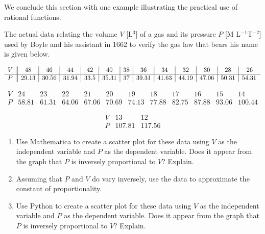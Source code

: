 \ifanalysis
We conclude this section with one example illustrating the practical use of rational functions. 



\begin{example}
\label{ex_druk}
The actual data relating the volume $V$ [L$^3$] of a gas and its pressure $P$ [M L$^{-1}$T$^{-2}$] used by Boyle and his assistant in 1662 to verify the gas law that bears his name is given below.

\[ \begin{array}{c||c|c|c|c|c|c|c|c|c|c|c|c}  

V & 48 & 46 & 44 & 42 & 40 & 38 & 36 & 34 & 32 & 30 & 28 & 26   \\ \hline

P & 29.13 & 30.56 & 31.94 & 33.5 & 35.31 & 37 & 39.31 & 41.63 & 44.19 & 47.06 & 50.31 & 54.31 $\,$   \end{array} \]


\[\begin{array}{c||c|c|c|c|c|c|c|c|c|c|c} 

V & 24&23 & 22 & 21 & 20 & 19 & 18 & 17 & 16 & 15 & 14   \\ \hline 

P &58.81& 61.31 & 64.06 & 67.06 & 70.69 & 74.13 & 77.88 & 82.75 & 87.88 & 93.06 & 100.44   \end{array} \]


\[\begin{array}{c||c|c} 

V &  13 & 12  \\ \hline 

P &107.81 & 117.56   \end{array} \]

\begin{enumerate}
\ifmathematica
\item  Use Mathematica to create a scatter plot for these data using $V$ as the independent variable and $P$ as the dependent variable.  Does it appear from the graph that $P$ is inversely proportional to $V$?  Explain.

\item  Assuming that $P$ and $V$ do vary inversely, use the data to approximate the constant of proportionality.
\fi
\ifpython
\item  Use Python to create a scatter plot for these data using $V$ as the independent variable and $P$ as the dependent variable.  Does it appear from the graph that $P$ is inversely proportional to $V$?  Explain.


\end{enumerate}
\end{example}
